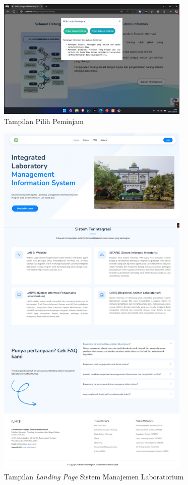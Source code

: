 \begin{figure}
	\centering
	\includegraphics[width=0.82\textwidth]{konten/gambar/perbaikan/pilih-peminjam.png}
	\caption{Tampilan Pilih Peminjam}
	\label{fig:pilih-peminjam}
\end{figure}

\begin{figure}
	\centering
	\includegraphics[width=0.82\textwidth]{konten/gambar/hasil/landing-page.jpeg}
	\caption{Tampilan \textit{Landing Page} Sistem Manajemen Laboratorium}
	\label{fig:landing-page}
\end{figure}


